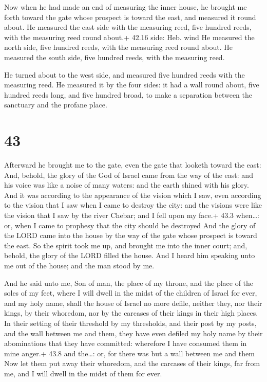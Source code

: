  Now when he had made an end of measuring the inner house,
he brought me forth toward the gate whose prospect is toward the east,
and measured it round about.  He measured the east side
with the measuring reed, five hundred reeds, with the measuring reed
round about.+ 42.16 side: Heb. wind  He measured the north
side, five hundred reeds, with the measuring reed round about.
 He measured the south side, five hundred reeds, with the
measuring reed.

 He turned about to the west side, and measured five
hundred reeds with the measuring reed.  He measured it by
the four sides: it had a wall round about, five hundred reeds long, and
five hundred broad, to make a separation between the sanctuary and the
profane place.

\hypertarget{section-42}{%
\section{43}\label{section-42}}

 Afterward he brought me to the gate, even the gate that
looketh toward the east:  And, behold, the glory of the God
of Israel came from the way of the east: and his voice was like a noise
of many waters: and the earth shined with his glory.  And it
was according to the appearance of the vision which I saw, even
according to the vision that I saw when I came to destroy the city: and
the visions were like the vision that I saw by the river Chebar; and I
fell upon my face.+ 43.3 when\ldots: or, when I came to prophesy that
the city should be destroyed  And the glory of the LORD came
into the house by the way of the gate whose prospect is toward the east.
 So the spirit took me up, and brought me into the inner
court; and, behold, the glory of the LORD filled the house. 
And I heard him speaking unto me out of the house; and the man stood by
me.

 And he said unto me, Son of man, the place of my throne,
and the place of the soles of my feet, where I will dwell in the midst
of the children of Israel for ever, and my holy name, shall the house of
Israel no more defile, neither they, nor their kings, by their whoredom,
nor by the carcases of their kings in their high places.  In
their setting of their threshold by my thresholds, and their post by my
posts, and the wall between me and them, they have even defiled my holy
name by their abominations that they have committed: wherefore I have
consumed them in mine anger.+ 43.8 and the\ldots: or, for there was but
a wall between me and them  Now let them put away their
whoredom, and the carcases of their kings, far from me, and I will dwell
in the midst of them for ever.

